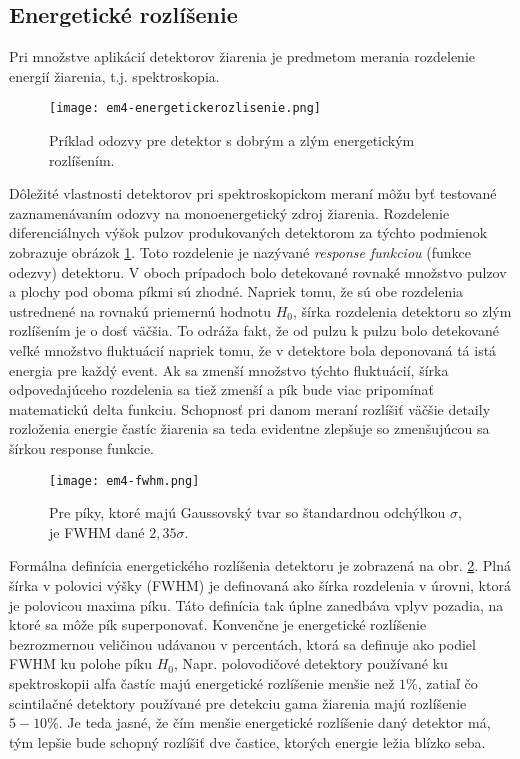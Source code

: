\documentclass[../../main.tex]{subfiles}
\begin{document}
\subsection{Energetické rozlíšenie}

Pri množstve aplikácií detektorov žiarenia je predmetom merania rozdelenie energií žiarenia, t.j. spektroskopia. 

\begin{figure}[h]
\centering
\texttt{[image: em4-energetickerozlisenie.png]}
\caption{Príklad odozvy pre detektor s dobrým a zlým energetickým rozlíšením.}
\label{em4:img:energetickerozlisenie}
\end{figure}

Dôležité vlastnosti detektorov pri spektroskopickom meraní môžu byť testované zaznamenávaním odozvy na monoenergetický zdroj žiarenia. Rozdelenie diferenciálnych výšok pulzov produkovaných detektorom za týchto podmienok zobrazuje obrázok \ref{em4:img:energetickerozlisenie}. Toto rozdelenie je nazývané \textit{response funkciou} (funkce odezvy) detektoru. V oboch prípadoch bolo detekované rovnaké množstvo pulzov a plochy pod oboma píkmi sú zhodné. Napriek tomu, že sú obe rozdelenia ustrednené na rovnakú priemernú hodnotu $H_0$, šírka rozdelenia detektoru so zlým rozlíšením je o dosť väčšia. To odráža fakt, že od pulzu k pulzu bolo detekované veľké množstvo fluktuácií napriek tomu, že v detektore bola deponovaná tá istá energia pre každý event. Ak sa zmenší množstvo týchto fluktuácií, šírka odpovedajúceho rozdelenia sa tiež zmenší a pík bude viac pripomínať matematickú delta funkciu. Schopnosť pri danom meraní rozlíšiť väčšie detaily rozloženia energie častíc žiarenia sa teda evidentne zlepšuje so zmenšujúcou sa šírkou response funkcie.

\begin{figure}[h]
\centering
\texttt{[image: em4-fwhm.png]}
\caption{Pre píky, ktoré majú Gaussovský tvar so štandardnou odchýlkou $\sigma$, je FWHM dané $2,35\sigma$.}
\label{em4:img:fwhm}
\end{figure}

Formálna definícia energetického rozlíšenia detektoru je zobrazená na obr. \ref{em4:img:fwhm}. Plná šírka v polovici výšky (FWHM) je definovaná ako šírka rozdelenia v úrovni, ktorá je polovicou maxima píku. Táto definícia tak úplne zanedbáva vplyv pozadia, na ktoré sa môže pík superponovať. Konvenčne je energetické rozlíšenie bezrozmernou veličinou udávanou v percentách, ktorá sa definuje ako podiel FWHM ku polohe píku $H_0$, Napr. polovodičové detektory používané ku spektroskopii alfa častíc majú energetické rozlíšenie menšie než $1\%$, zatiaľ čo scintilačné detektory používané pre detekciu gama žiarenia majú rozlíšenie $5-10\%$. Je teda jasné, že čím menšie energetické rozlíšenie daný detektor má, tým lepšie bude schopný rozlíšiť dve častice, ktorých energie ležia blízko seba. 
\end{document}
